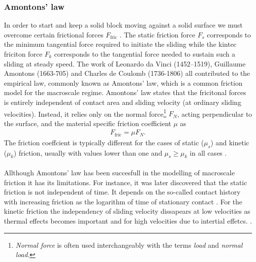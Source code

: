 \subsubsection{Amontons’ law}
 
 In order to start and keep a solid block moving against a solid
 surface we must overcome certain frictional forces $F_{\text{fric}}$ \cite{gnecco_meyer_2015}. The static friction force $F_s$ corresponds to the minimum tangential force required to
 initiate the sliding while the kintec friciton force $F_k$ corresponds to the
 tangential force needed to sustain such a sliding at steady speed. The work of Leonardo da Vinci (1452–1519), Guillaume Amontons (1663-705) and
 Charles de Coulomb (1736-1806) all contributed to the empirical law, commonly known as Amontons’ law, which is a common friction model for the macroscale regime. Amontons’ law states that the fricitonal forces is entirely independent of contact area and sliding velocity (at ordinary sliding velocities). Instead, it relies only on the normal force\footnote{\textit{Normal force} is often used interchangeably with the terms \textit{load} and \textit{normal load}.} $F_N$, acting perpendicular to the surface, and the material specific friction coefficient $\mu$ as
\begin{align}
  F_{\text{fric}} = \mu F_N.
  \label{eq:amonton}
\end{align}
The friction coeffcient is typically different for the cases of static ($\mu_s$)
and kinetic ($\mu_k$) friction, usually with values lower than one and $\mu_s \ge
\mu_k$ in all cases \cite[p. 6]{gnecco_meyer_2015}.
\\
\\
Allthough Amontons’ law has been succesfull in the modelling of macroscale friction it has its limitations. For instance, it was later discovered that the static friction is not independent of time. It depends on the so-called contact history with increasing friction as the logarithm of time of stationary contact
\cite{dieterich_1972}. For the kinetic friction the independency of sliding
velocity dissapears at low velocities as thermal effects becomes important and
for high velocities due to intertial effetcs. \cite[pp. 5-6]{gnecco_meyer_2015}. 

